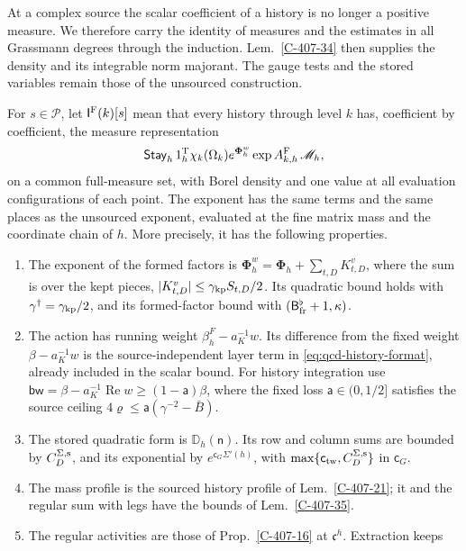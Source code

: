 \documentclass[11pt,letterpaper,reqno]{amsart}
\makeatletter
\theoremstyle{definition}
\newcommand{\ms@minorstart}{%
  \pushQED{\qed}\renewcommand{\qedsymbol}{$\blacksquare$}}
\newenvironment{definition}[1][]{\ms@minorstart\ms@definition[#1]}
  {\popQED\endms@definition}
\theoremstyle{remark}
\makeatother
\begin{document}
At a complex source the scalar coefficient of a history is no
longer a positive measure. We therefore carry the identity of
measures and the estimates in all Grassmann degrees through the
induction. Lem.~\ref{C-407-34} then supplies the density and its
integrable norm majorant. The gauge tests and the stored variables
remain those of the unsourced construction.

\begin{definition}[The sourced inductive statement]\label{C-407-36}
For $s\in\mathcal P$, let $\mathsf I^{\rm F}(k)[s]$ mean that every
history through level $k$ has, coefficient by coefficient, the
measure representation
\[
 \mathsf{Stay}_h\,1_h^{\rm T}\chi_k(\Omega_k)
       e^{\boldsymbol\Phi_h^w}\exp A^{\rm F}_{k,h}\,\mathscr M_h,
\]
on a common full-measure set, with Borel density and one value at
all evaluation configurations of each point. The exponent has the
same terms and the same places as the unsourced exponent, evaluated
at the fine matrix mass and the coordinate chain of $h$. More
precisely, it has the following properties.
\begin{enumerate}
\item The exponent of the formed factors is
$\boldsymbol\Phi_h^w=\boldsymbol\Phi_h+\sum_{t,D}K^v_{t,D}$,
where the sum is over the kept pieces,
$|K^v_{t,D}|\le\gamma_{\rm kp}S_{t,D}/2$. Its quadratic bound
holds with $\gamma^\dagger=\gamma_{\rm kp}/2$, and its
formed-factor bound with $(\mathsf B_{\rm fr}^\flat+1,\kappa)$.
\item The action has running weight $\beta_h^F-a_K^{-1}w$.
Its difference from the fixed weight $\beta-a_K^{-1}w$ is
the source-independent layer term in
\eqref{eq:qcd-history-format}, already included in the scalar
bound. For history integration use
$\mathsf{bw}=\beta-a_K^{-1}\operatorname{Re}w
\ge(1-\mathsf a)\beta$, where the fixed loss
$\mathsf a\in(0,1/2]$ satisfies the source ceiling
$4\varrho\le\mathsf a(\gamma^{-2}-\bar B)$.
\item The stored quadratic form is $\mathbb D_h(\mathsf n)$.
Its row and column sums are bounded by $C_D^{\Sigma,\rm s}$,
and its exponential by $e^{\mathsf c_G\Sigma'(h)}$, with
$\max\{\mathsf c_{\rm tw},C_D^{\Sigma,\rm s}\}$ in
$\mathsf c_G$.
\item The mass profile is the sourced history profile of
Lem.~\ref{C-407-21}; it and the regular sum with legs have the
bounds of Lem.~\ref{C-407-35}.
\item The regular activities are those of
Prop.~\ref{C-407-16} at $\mathfrak c^h$. Extraction keeps

\end{enumerate}
\end{definition}
\end{document}

